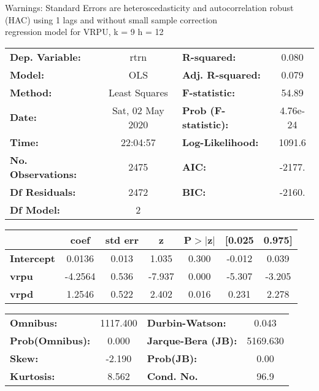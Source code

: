 Warnings: \newline
 [1] Standard Errors are heteroscedasticity and autocorrelation robust (HAC) using 1 lags and without small sample correction\\ 

regression model for VRPU, k = 9 h = 12\begin{center}
\begin{tabular}{lclc}
\toprule
\textbf{Dep. Variable:}    &       rtrn       & \textbf{  R-squared:         } &     0.080   \\
\textbf{Model:}            &       OLS        & \textbf{  Adj. R-squared:    } &     0.079   \\
\textbf{Method:}           &  Least Squares   & \textbf{  F-statistic:       } &     54.89   \\
\textbf{Date:}             & Sat, 02 May 2020 & \textbf{  Prob (F-statistic):} &  4.76e-24   \\
\textbf{Time:}             &     22:04:57     & \textbf{  Log-Likelihood:    } &    1091.6   \\
\textbf{No. Observations:} &        2475      & \textbf{  AIC:               } &    -2177.   \\
\textbf{Df Residuals:}     &        2472      & \textbf{  BIC:               } &    -2160.   \\
\textbf{Df Model:}         &           2      & \textbf{                     } &             \\
\bottomrule
\end{tabular}
\begin{tabular}{lcccccc}
                   & \textbf{coef} & \textbf{std err} & \textbf{z} & \textbf{P$> |$z$|$} & \textbf{[0.025} & \textbf{0.975]}  \\
\midrule
\textbf{Intercept} &       0.0136  &        0.013     &     1.035  &         0.300        &       -0.012    &        0.039     \\
\textbf{vrpu}      &      -4.2564  &        0.536     &    -7.937  &         0.000        &       -5.307    &       -3.205     \\
\textbf{vrpd}      &       1.2546  &        0.522     &     2.402  &         0.016        &        0.231    &        2.278     \\
\bottomrule
\end{tabular}
\begin{tabular}{lclc}
\textbf{Omnibus:}       & 1117.400 & \textbf{  Durbin-Watson:     } &    0.043  \\
\textbf{Prob(Omnibus):} &   0.000  & \textbf{  Jarque-Bera (JB):  } & 5169.630  \\
\textbf{Skew:}          &  -2.190  & \textbf{  Prob(JB):          } &     0.00  \\
\textbf{Kurtosis:}      &   8.562  & \textbf{  Cond. No.          } &     96.9  \\
\bottomrule
\end{tabular}
\end{center}

